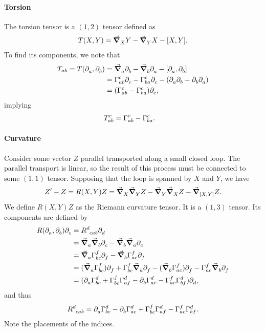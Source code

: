 \paragraph{Torsion}
The torsion tensor is a $(1, 2)$ tensor defined as
\begin{align*}
	T(X, Y) = \dcov{X}{Y} - \dcov{Y}{X} - \comm{X}{Y}.
\end{align*}
To find its components, we note that
\begin{align*}
	T_{ab} = T(\del{a}{}, \del{b}{}) &= \dcov{a}{\del{b}{}} - \dcov{b}{\del{a}{}} - \comm{\del{a}{}}{\del{b}{}} \\
	&= \chris{c}{a}{b}\del{c}{} - \chris{c}{b}{a}\del{c}{} - (\del{a}{\del{b}{}} - \del{b}{\del{a}{}}) \\
	&= (\chris{c}{a}{b} - \chris{c}{b}{a})\del{c}{},
\end{align*}
implying
\begin{align*}
	T_{ab}^{c} &= \chris{c}{a}{b} - \chris{c}{b}{a}.
\end{align*}

\paragraph{Curvature}
Consider some vector $Z$ parallel transported along a small closed loop. The parallel transport is linear, so the result of this process must be connected to some $(1, 1)$ tensor. Supposing that the loop is spanned by $X$ and $Y$, we have
\begin{align*}
	Z^{\prime} - Z = R(X, Y)Z = \dcov{X}{\dcov{Y}{Z}} - \dcov{Y}{\dcov{X}{Z}} - \dcov{\comm{X}{Y}}{Z}.
\end{align*}
We define $R(X, Y)Z$ as the Riemann curvature tensor. It is a $(1, 3)$ tensor. Its components are defined by
\begin{align*}
	R(\del{a}{}, \del{b}{})\del{c}{} &= \tensor{R}{^{d}_{cab}}\del{d}{} \\
	&= \dcov{a}{\dcov{b}{\del{c}{}}} - \dcov{b}{\dcov{a}{\del{c}{}}} \\
	&= \dcov{a}{\chris{f}{b}{c}\del{f}{}} - \dcov{b}{\chris{f}{a}{c}\del{f}{}} \\
	&= (\dcov{a}{\chris{f}{b}{c}})\del{f}{} + \chris{f}{b}{c}\dcov{a}{\del{f}{}} - (\dcov{b}{\chris{f}{a}{c}})\del{f}{} - \chris{f}{a}{c}\dcov{b}{\del{f}{}} \\
	&= (\del{a}{\chris{d}{b}{c}} + \chris{f}{b}{c}\chris{d}{a}{f} - \del{b}{\chris{d}{a}{c}} - \chris{f}{a}{c}\chris{d}{b}{f})\del{d}{}, 
\end{align*}
and thus
\begin{align*}
	\tensor{R}{^{d}_{cab}} = \del{a}{\chris{d}{b}{c}} - \del{b}{\chris{d}{a}{c}} + \chris{f}{b}{c}\chris{d}{a}{f} - \chris{f}{a}{c}\chris{d}{b}{f}.
\end{align*}
Note the placements of the indices.

